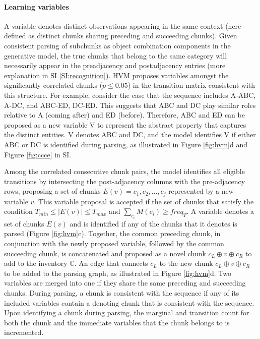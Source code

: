 \documentclass{article} %
\theoremstyle{remark}
\begin{document}
\paragraph{Learning variables}
A variable denotes distinct observations appearing in the same context (here defined as distinct chunks sharing preceding and succeeding chunks). Given consistent parsing of subchunks as object combination components in the generative model, the true chunks that belong to the same category will necessarily appear in the preadjacency and postadjacency entries (more explanation in SI \ref{SI:recognition}). HVM proposes variables amongst the significantly correlated chunks ($p \leq 0.05$) in the transition matrix consistent with this structure. For example, consider the case that the sequence includes A-ABC, A-DC, and  ABC-ED, DC-ED. This suggests that ABC and DC play similar roles relative to A (coming after) and ED (before). Therefore, ABC and ED can be proposed as a new variable V to represent the abstract property that captures the distinct entities. V denotes ABC and DC, and the model identifies V if either ABC or DC is identified during parsing, as illustrated in Figure \ref{fig:hvm}d and Figure \ref{fig:ccce} in SI. 

Among the correlated consecutive chunk pairs, the model identifies all eligible transitions by intersecting the post-adjacency columns with the pre-adjacency rows, proposing a set of chunks $E(v) = {c_1, c_2, ..., c_j}$ represented by a new variable $v$. This variable proposal is accepted if the set of chunks that satisfy the condition $T_{min} \leq |E(v)| \leq T_{max}$ and $\sum_{c_i} M(c_i) \geq freq_T$.
A variable denotes a set of chunks $E(v)$ and is identified if any of the chunks that it denotes is parsed (Figure \ref{fig:hvm}c). Together, the common preceding chunk, in conjunction with the newly proposed variable, followed by the common succeeding chunk, is concatenated and proposed as a novel chunk $c_L \oplus v \oplus c_R$ to add to the inventory $\mathbb{C}$. An edge that connects $c_L$ to the new chunk $c_L \oplus v \oplus c_R$ to be added to the parsing graph, as illustrated in Figure \ref{fig:hvm}d. %
Two variables are merged into one if they share the same preceding and succeeding chunks. During parsing, a chunk is consistent with the sequence if any of its included variables contain a denoting chunk that is consistent with the sequence. Upon identifying a chunk during parsing, the marginal and transition count for both the chunk and the immediate variables that the chunk belongs to is incremented.
\end{document}
